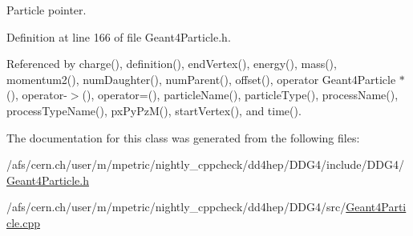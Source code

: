 Particle pointer. 

Definition at line 166 of file Geant4Particle.h.

Referenced by charge(), definition(), endVertex(), energy(), mass(), momentum2(), numDaughter(), numParent(), offset(), operator Geant4Particle $\ast$(), operator-\/$>$(), operator=(), particleName(), particleType(), processName(), processTypeName(), pxPyPzM(), startVertex(), and time().

The documentation for this class was generated from the following files:\begin{DoxyCompactItemize}
\item 
/afs/cern.ch/user/m/mpetric/nightly\_\-cppcheck/dd4hep/DDG4/include/DDG4/\hyperlink{_geant4_particle_8h}{Geant4Particle.h}\item 
/afs/cern.ch/user/m/mpetric/nightly\_\-cppcheck/dd4hep/DDG4/src/\hyperlink{_geant4_particle_8cpp}{Geant4Particle.cpp}\end{DoxyCompactItemize}
